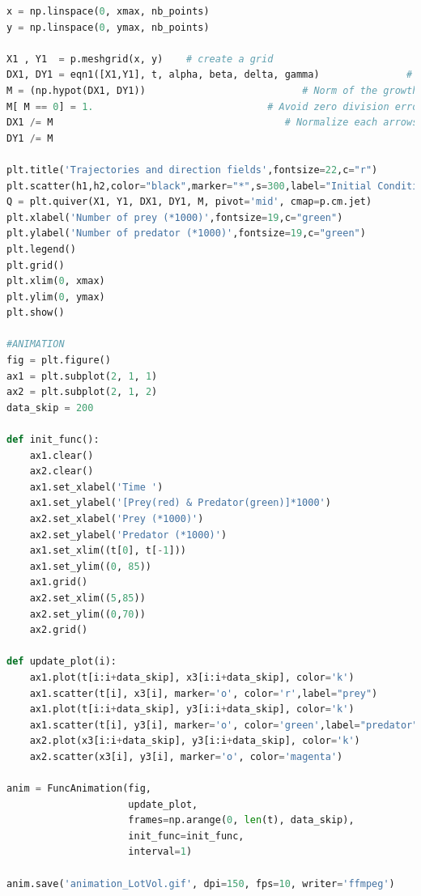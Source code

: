 \documentclass[12pt]{article}
\begin{document}
\begin{lstlisting}[language=Python, caption=Python example]
x = np.linspace(0, xmax, nb_points)
y = np.linspace(0, ymax, nb_points)

X1 , Y1  = p.meshgrid(x, y)    # create a grid     
DX1, DY1 = eqn1([X1,Y1], t, alpha, beta, delta, gamma)               # compute growth rate on the grid
M = (np.hypot(DX1, DY1))                           # Norm of the growth rate 
M[ M == 0] = 1.                              # Avoid zero division errors 
DX1 /= M                                        # Normalize each arrows
DY1 /= M

plt.title('Trajectories and direction fields',fontsize=22,c="r")
plt.scatter(h1,h2,color="black",marker="*",s=300,label="Initial Conditions")
Q = plt.quiver(X1, Y1, DX1, DY1, M, pivot='mid', cmap=p.cm.jet)
plt.xlabel('Number of prey (*1000)',fontsize=19,c="green")
plt.ylabel('Number of predator (*1000)',fontsize=19,c="green")
plt.legend()
plt.grid()
plt.xlim(0, xmax)
plt.ylim(0, ymax)
plt.show()

#ANIMATION
fig = plt.figure()
ax1 = plt.subplot(2, 1, 1)
ax2 = plt.subplot(2, 1, 2)
data_skip = 200

def init_func():
    ax1.clear()
    ax2.clear()
    ax1.set_xlabel('Time ')
    ax1.set_ylabel('[Prey(red) & Predator(green)]*1000')
    ax2.set_xlabel('Prey (*1000)')
    ax2.set_ylabel('Predator (*1000)')
    ax1.set_xlim((t[0], t[-1]))
    ax1.set_ylim((0, 85))
    ax1.grid()
    ax2.set_xlim((5,85))
    ax2.set_ylim((0,70))
    ax2.grid()

def update_plot(i):
    ax1.plot(t[i:i+data_skip], x3[i:i+data_skip], color='k')
    ax1.scatter(t[i], x3[i], marker='o', color='r',label="prey")
    ax1.plot(t[i:i+data_skip], y3[i:i+data_skip], color='k')
    ax1.scatter(t[i], y3[i], marker='o', color='green',label="predator")
    ax2.plot(x3[i:i+data_skip], y3[i:i+data_skip], color='k')
    ax2.scatter(x3[i], y3[i], marker='o', color='magenta')

anim = FuncAnimation(fig,
                     update_plot,
                     frames=np.arange(0, len(t), data_skip),
                     init_func=init_func,
                     interval=1)

anim.save('animation_LotVol.gif', dpi=150, fps=10, writer='ffmpeg')


\end{lstlisting}
\newpage
\end{document}
